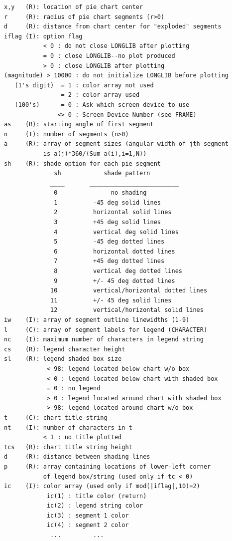 \documentclass[11pt]{report}
\begin{document}
\begin{verbatim}
x,y   (R): location of pie chart center
r     (R): radius of pie chart segments (r>0)
d     (R): distance from chart center for "exploded" segments
iflag (I): option flag
           < 0 : do not close LONGLIB after plotting
           = 0 : close LONGLIB--no plot produced
           > 0 : close LONGLIB after plotting
(magnitude) > 10000 : do not initialize LONGLIB before plotting
   (1's digit)  = 1 : color array not used
                = 2 : color array used
   (100's)      = 0 : Ask which screen device to use
               <> 0 : Screen Device Number (see FRAME)
as    (R): starting angle of first segment
n     (I): number of segments (n>0)
a     (R): array of segment sizes (angular width of jth segment
           is a(j)*360/(Sum a(i),i=1,N))
sh    (R): shade option for each pie segment
              sh            shade pattern
             ____       _________________________
              0               no shading
              1          -45 deg solid lines
              2          horizontal solid lines
              3          +45 deg solid lines
              4          vertical deg solid lines
              5          -45 deg dotted lines
              6          horizontal dotted lines
              7          +45 deg dotted lines
              8          vertical deg dotted lines
              9          +/- 45 deg dotted lines
             10          vertical/horizontal dotted lines
             11          +/- 45 deg solid lines
             12          vertical/horizontal solid lines
iw    (I): array of segment outline linewidths (1-9)
l     (C): array of segment labels for legend (CHARACTER)
nc    (I): maximum number of characters in legend string
cs    (R): legend character height
sl    (R): legend shaded box size
            < 98: legend located below chart w/o box
            < 0 : legend located below chart with shaded box
            = 0 : no legend
            > 0 : legend located around chart with shaded box 
            > 98: legend located around chart w/o box
t     (C): chart title string
nt    (I): number of characters in t
           < 1 : no title plotted
tcs   (R): chart title string height
d     (R): distance between shading lines
p     (R): array containing locations of lower-left corner
           of legend box/string (used only if tc < 0)
ic    (I): color array (used only if mod(|iflag|,10)=2)
            ic(1) : title color (return)
            ic(2) : legend string color
            ic(3) : segment 1 color
            ic(4) : segment 2 color
             ...         ...
\end{verbatim}
\end{document}
